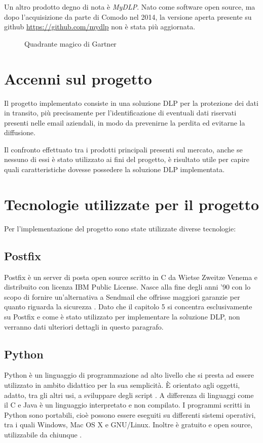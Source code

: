     Un altro prodotto degno di nota è \textit{MyDLP}. Nato come software open source,
    ma dopo l'acquisizione da parte di Comodo nel 2014, la versione aperta presente su github
    \url{https://github.com/mydlp} non è stata più aggiornata.

    \begin{figure}
        \centering
        \caption{Quadrante magico di Gartner}\label{Gartner}
      \end{figure}

\section{Accenni sul progetto}
Il progetto implementato consiste in una soluzione DLP per la protezione dei dati in transito, più precisamente per
l'identificazione di eventuali dati riservati presenti nelle email aziendali, in modo da prevenirne la perdita
ed evitarne la diffusione.

Il confronto effettuato tra i prodotti principali presenti sul mercato, anche se nessuno di essi è stato utilizzato 
ai fini del progetto, è risultato utile per capire quali caratteristiche dovesse possedere la soluzione DLP implementata.

\section{Tecnologie utilizzate per il progetto}
Per l'implementazione del progetto sono state utilizzate diverse tecnologie:
    \subsection{Postfix}
    Postfix è un server di posta open source scritto in C da Wietse Zweitze Venema e distribuito con licenza IBM 
    Public License. Nasce alla fine degli anni '90 con lo scopo di fornire un'alternativa a Sendmail che offrisse 
    maggiori garanzie per quanto riguarda la sicurezza \cite{Postfix1}.
    Dato che il capitolo 5 si concentra esclusivamente su Postfix e come è stato utilizzato per implementare la 
    soluzione DLP, non verranno dati ulteriori dettagli in questo paragrafo.
    
    \subsection{Python}
    Python è un linguaggio di programmazione ad alto livello che si presta ad essere utilizzato in ambito didattico per la sua semplicità. È orientato agli oggetti, adatto, tra gli altri usi, a sviluppare 
    degli script \cite{Python1}. A differenza di linguaggi come il C e Java è un linguaggio interpretato e non compilato. 
    I programmi scritti in Python sono portabili, 
    cioè possono essere eseguiti su differenti sistemi operativi, tra i quali Windows, Mac OS X e GNU/Linux. 
    Inoltre è gratuito e open source, utilizzabile da chiunque \cite{boscaini2017imparare}.

